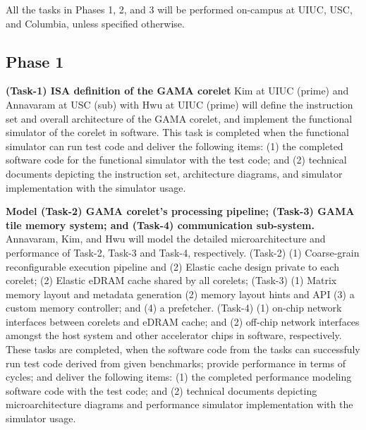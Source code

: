 \noindent
All the tasks in Phases 1, 2, and 3 will be performed on-campus at UIUC, USC, and Columbia, unless specified otherwise.

\subsection{Phase 1}
\noindent
\textbf{(Task-1) ISA definition of the GAMA corelet} 
Kim at UIUC (prime) and Annavaram at USC (sub) with Hwu at UIUC (prime) will define the instruction set and overall architecture of the GAMA corelet, and implement the functional simulator of the corelet in software.
This task is completed when the functional simulator can run test code and deliver the following items: 
(1) the completed software code for the functional simulator with the test code; and (2) technical documents depicting the instruction set, architecture diagrams, and simulator implementation with the simulator usage.


\vspace{3pt}
\noindent
\textbf{Model (Task-2) GAMA corelet's processing pipeline; (Task-3) GAMA tile memory system; and (Task-4) communication sub-system.}
Annavaram, Kim, and Hwu will model the detailed microarchitecture and performance of Task-2, Task-3 and Task-4, respectively.  
(Task-2) (1) Coarse-grain reconfigurable execution pipeline and (2) Elastic cache design private to each corelet; (2) Elastic eDRAM cache shared by all corelets; 
(Task-3) (1) Matrix memory layout and metadata generation (2) memory layout hints and API (3) a custom memory controller; and (4) a prefetcher.
(Task-4) (1) on-chip network interfaces between corelets and eDRAM cache; and (2) off-chip network interfaces amongst the host system and other accelerator chips in software, respectively.
These tasks are completed, when the software code from the tasks can successfuly run test code derived from given benchmarks; provide performance in terms of cycles; and deliver the following items:
(1) the completed performance modeling software code with the test code; and (2) technical documents depicting microarchitecture diagrams and performance simulator implementation with the simulator usage.


